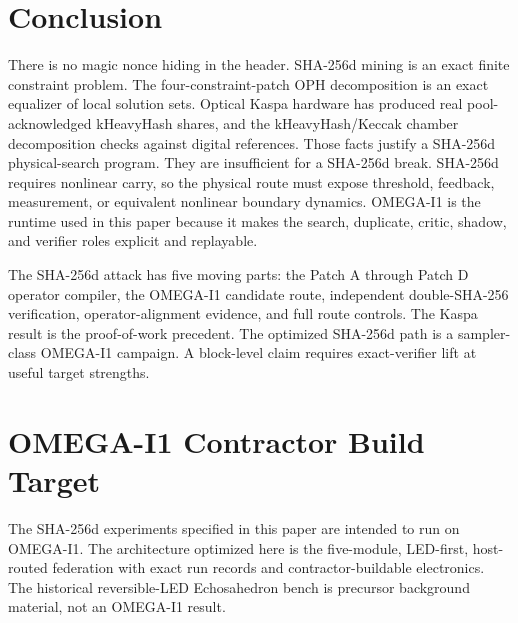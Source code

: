 \documentclass[11pt]{article}
\theoremstyle{definition}
\theoremstyle{remark}
\begin{document}
\section{Conclusion}

There is no magic nonce hiding in the header. SHA-256d mining is an exact
finite constraint problem. The four-constraint-patch OPH decomposition
is an exact equalizer of local solution sets. Optical Kaspa hardware has
produced real pool-acknowledged kHeavyHash shares, and the kHeavyHash/Keccak
chamber decomposition checks against digital references. Those facts justify a
SHA-256d physical-search program. They are insufficient for a SHA-256d break.
SHA-256d requires nonlinear carry, so the physical route must expose threshold,
feedback, measurement, or equivalent nonlinear boundary dynamics. OMEGA-I1 is
the runtime used in this paper because it makes the search, duplicate, critic,
shadow, and verifier roles explicit and replayable.

The SHA-256d attack has five moving parts: the Patch A through Patch D operator
compiler, the OMEGA-I1 candidate route, independent double-SHA-256
verification, operator-alignment evidence, and full route controls. The Kaspa
result is the proof-of-work precedent. The optimized SHA-256d path is a
sampler-class OMEGA-I1 campaign. A block-level claim requires exact-verifier
lift at useful target strengths.

\appendix

\section{OMEGA-I1 Contractor Build Target}
\label{app:omega-i1-build}

The SHA-256d experiments specified in this paper are intended to run on
OMEGA-I1. The architecture optimized here is the five-module, LED-first,
host-routed federation with exact run records and contractor-buildable
electronics. The historical reversible-LED Echosahedron bench is precursor
background material, not an OMEGA-I1 result.
\end{document}
